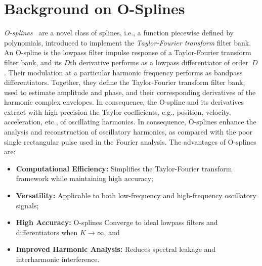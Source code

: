 \appendices

\section{Background on O-Splines}
\label{sec:background_on_osplines}

\textit{O-splines}~\cite{delaOSerna_2020} are a novel class of splines, i.e., a function piecewise defined by polynomials, introduced to implement the \textit{Taylor-Fourier transform} filter bank. An O-spline is the lowpass filter impulse response of a Taylor-Fourier transform filter bank, and its $D$th derivative performs as a lowpass differentiator of order~$D$. Their modulation at a particular harmonic frequency performs as bandpass differentiators. Together, they define the Taylor-Fourier transform filter bank, used to estimate amplitude and phase, and their corresponding derivatives of the harmonic complex envelopes. In consequence, the O-spline and its derivatives extract with high precision the Taylor coefficients, e.g., position, velocity, acceleration, etc., of oscillating harmonics. In consequence, O-splines enhance the analysis and reconstruction of oscillatory harmonics, as compared with the poor single rectangular pulse used in the Fourier analysis. The advantages of O-splines are:
\begin{itemize}
\item \textbf{Computational Efficiency:} Simplifies the Taylor-Fourier transform framework while maintaining high accuracy;
\item \textbf{Versatility:} Applicable to both low-frequency and high-frequency oscillatory signals;
\item \textbf{High Accuracy:} O-splines Converge to ideal lowpass filters and differentiators when $K \rightarrow \infty$, and
\item \textbf{Improved Harmonic Analysis:} Reduces spectral leakage and interharmonic interference.
\end{itemize}



